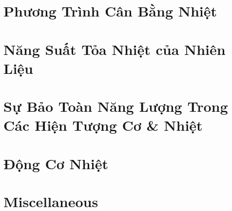 \documentclass{article}
\numberwithin{equation}{section}
\begin{document}

\section{Phương Trình Cân Bằng Nhiệt}


\section{Năng Suất Tỏa Nhiệt của Nhiên Liệu}


\section{Sự Bảo Toàn Năng Lượng Trong Các Hiện Tượng Cơ \& Nhiệt}


\section{Động Cơ Nhiệt}


\section{Miscellaneous}


\printbibliography[heading=bibintoc]
	
\end{document}
